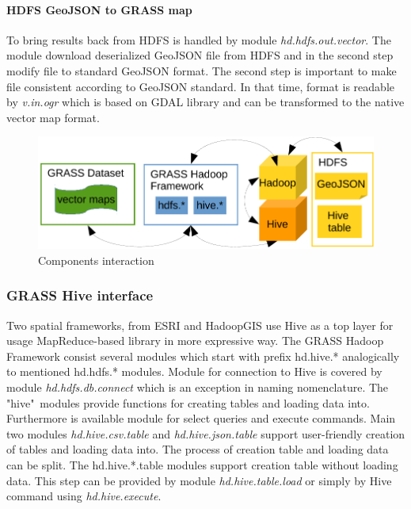 \documentclass[a4paper,12pt,oneside]{report}
\begin{document}
	
	
    \paragraph{HDFS GeoJSON to GRASS map}
    To bring results back from HDFS is handled by module \textit{hd.hdfs.out.vector}.
    The module download deserialized GeoJSON file from HDFS and in the second step
    modify file to standard GeoJSON format. The second step is important to make
    file consistent according to GeoJSON standard. In that time, format is readable
    by \textit{v.in.ogr} which is based on GDAL library and can be transformed
    to the native vector map format.
    \begin{figure}[!htbp]
    	\centering
    	\includegraphics[width=1\textwidth]{./img/ghf_overview.pdf}
    	\caption[Components interaction]{\centering Components interaction}
    \end{figure} 
    \subsubsection{GRASS Hive interface}
    Two spatial frameworks, from ESRI and HadoopGIS use Hive as a top layer for
    usage MapReduce-based library in more expressive way. The GRASS Hadoop Framework
    consist several modules which start with prefix hd.hive.* analogically to mentioned
    hd.hdfs.* modules. Module for connection to Hive is covered by module
    \textit{hd.hdfs.db.connect} which is an exception in naming nomenclature. The
    "hive"~modules provide functions for creating tables and loading data into.
    Furthermore is available module for select queries and execute commands. Main
    two modules \textit{hd.hive.csv.table} and \textit{hd.hive.json.table} support user-friendly creation of tables and loading data into. The process of creation table
    and loading data can be split. The hd.hive.*.table modules support creation table
    without loading data. This step can be provided by module \textit{hd.hive.table.load} or
    simply by Hive command using \textit{hd.hive.execute}.
    
\end{document}
